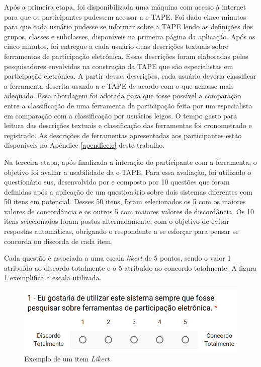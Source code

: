 \par
Após a primeira etapa, foi disponibilizada uma máquina com acesso à internet para que os participantes pudessem acessar a e-TAPE. Foi dado cinco minutos para que cada usuário pudesse se informar sobre a TAPE lendo as definições dos grupos, classes e subclasses,
disponíveis na primeira página da aplicação. 
Após os cinco minutos, foi entregue a cada usuário duas descrições textuais sobre ferramentas de participação eletrônica. Essas descrições foram elaboradas pelos pesquisadores envolvidos na construção da TAPE que são especialistas em participação eletrônica. 
A partir dessas descrições, cada usuário deveria classificar a ferramenta descrita usando a e-TAPE de acordo com o que achasse mais adequado.
Essa abordagem foi adotada para que fosse possível a comparação entre a classificação de uma ferramenta de participação feita por um especialista em comparação com a classificação por usuários leigos. O tempo gasto para leitura das descrições textuais e classificação das ferramentas foi cronometrado e registrado.
As descrições de ferramentas apresentadas aos participantes estão disponíveis no Apêndice \ref{apendice:c} deste trabalho.

\par
Na terceira etapa, após finalizada a interação do participante com a ferramenta, o objetivo foi avaliar a usabilidade da e-TAPE.
Para essa avaliação, foi utilizado o questionário \acrfull{sus}, desenvolvido por  e composto por 10 questões que foram definidas após a aplicação de um questionário sobre dois sistemas diferentes com 50 itens em potencial. Desses 50 itens, foram selecionados os 5 com os maiores valores de concordância e os outros 5 com maiores valores de discordância. Os 10 itens selecionados
foram postos alternadamente, com o objetivo de evitar respostas automáticas, obrigando o respondente a se esforçar para pensar se concorda ou discorda de cada item. 

\par

Cada questão é associada a uma escala \textit{likert} de 5 pontos, sendo o valor 1 atribuído ao discordo totalmente e o 5 atribuído ao concordo totalmente.
A figura \ref{fig:exemplo-pergunta} exemplifica a escala utilizada.

\begin{figure}[!ht]
    \centering
    \includegraphics[scale=0.5]{./figuras/exemplo_pergunta.png}
    \caption{Exemplo de um item \textit{Likert}}
    \label{fig:exemplo-pergunta}
\end{figure}

